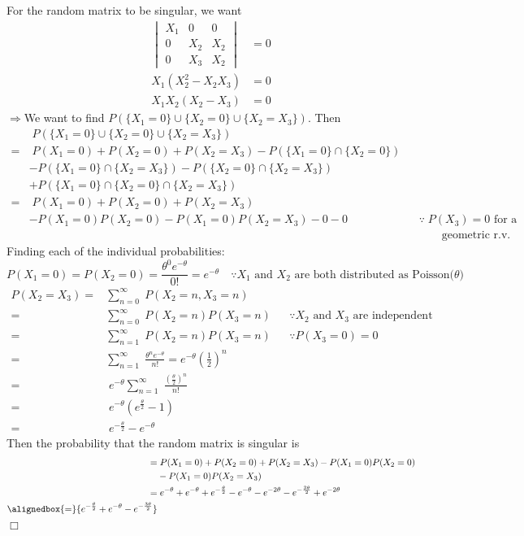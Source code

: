 \documentclass{mthe353answer}
\begin{document}
\begin{questions}
  \setcounter{question}{3}
  \question{}
  For the random matrix to be singular, we want
  \begin{align*}
    \begin{vmatrix}
      X_1 & 0 & 0\\
      0&X_2&X_2\\
      0&X_3&X_2
    \end{vmatrix} &= 0\\
    X_1(X_2^2-X_2X_3) &= 0\\
    X_1X_2(X_2-X_3) &= 0
  \end{align*}
  \(\Rightarrow\)We want to find \(P(\{X_1=0\}\cup\{X_2=0\}\cup\{X_2=X_3\})\). Then
  \begin{align*}
      &\; P(\{X_1=0\}\cup\{X_2=0\}\cup\{X_2=X_3\})\\
     =&\; P(X_1=0)+P(X_2=0)+P(X_2=X_3)-P(\{X_1=0\}\cap\{X_2=0\})\\
      &-P(\{X_1=0\}\cap\{X_2=X_3\})-P(\{X_2=0\}\cap\{X_2=X_3\})\\
      &+P(\{X_1=0\}\cap\{X_2=0\}\cap\{X_2=X_3\})\\
     =&\; P(X_1=0)+P(X_2=0)+P(X_2=X_3)\\
      &-P(X_1=0)P(X_2=0)-P(X_1=0)P(X_2=X_3)-0-0 && \because\; P(X_3)=0 \text{ for a}\\
      & &&\qquad \text{geometric r.v.}
  \end{align*}
  Finding each of the individual probabilities:
  \begin{displaymath}
    P(X_1=0)=P(X_2=0)=\frac{\theta^0e^{-\theta}}{0!}=e^{-\theta}\quad \because X_1 \text{ and } X_2 \text{ are both distributed as Poisson(\(\theta\))}
  \end{displaymath}
  \begin{align*}
    P(X_2=X_3) =& \sum_{n=0}^{\infty}\; P(X_2=n,X_3=n)\\
    =& \sum_{n=0}^{\infty}\; P(X_2=n)P(X_3=n) && \because X_2 \text{ and } X_3 \text{ are independent}\\
    =& \sum_{n=1}^{\infty}\; P(X_2=n)P(X_3=n) && \because P(X_3=0)=0\\
    =& \sum_{n=1}^{\infty}\; \frac{\theta^n{}e^{-\theta}}{n!}=e^{-\theta}\left(\frac{1}{2}\right)^n\\
    =&\; e^{-\theta} \sum_{n=1}^{\infty}\; \frac{\left(\frac{\theta}{2}\right)^n}{n!}\\
    =&\; e^{-\theta}\left(e^{\frac{\theta}{2}}-1\right)\\
    =&\; e^{-\frac{\theta}{2}}-e^{-\theta}
  \end{align*}
  Then the probability that the random matrix is singular is
  \begin{align*}
    =& \; P(X_1=0)+P(X_2=0)+P(X_2=X_3)-P(X_1=0)P(X_2=0)\\
     &-P(X_1=0)P(X_2=X_3)\\
    =& \; e^{-\theta}+e^{-\theta}+e^{-\frac{\theta}{2}}-e^{-\theta}-e^{-2\theta}-e^{-\frac{3\theta}{2}}+e^{-2\theta}\\
    \alignedbox{=}{e^{-\frac{\theta}{2}}+e^{-\theta}-e^{-\frac{3\theta}{2}}}
  \end{align*}
  \hfill{}\(\Box{}\)
\end{questions}
\end{document}
